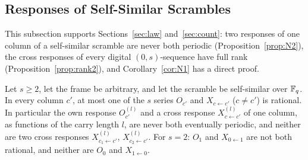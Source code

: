 \subsection{Responses of Self-Similar Scrambles}\label{app:responses}
This subsection supports Sections~\ref{sec:law} and~\ref{sec:count}: two responses of one column of a self-similar scramble are never both periodic (Proposition~\ref{prop:N2}), the cross responses of every digital $(0,s)$-sequence have full rank (Proposition~\ref{prop:rank2}), and Corollary~\ref{cor:N1} has a direct proof.

\begin{proposition}\label{prop:N2}
Let $s\ge2$, let the frame be arbitrary, and let the scramble be self-similar over $\mathbb{F}_q$. In every column $c'$, at most one of the $s$ series $O_{c'}$ and $X_{c\leftarrow c'}$ ($c\ne c'$) is rational. In particular the own response $O^{(l)}_{c'}$ and a cross response $X^{(l)}_{c\leftarrow c'}$ of one column, as functions of the carry length $l$, are never both eventually periodic, and neither are two cross responses $X^{(l)}_{c_1\leftarrow c'}$, $X^{(l)}_{c_2\leftarrow c'}$. For $s=2$: $O_1$ and $X_{0\leftarrow1}$ are not both rational, and neither are $O_0$ and $X_{1\leftarrow0}$.
\end{proposition}

